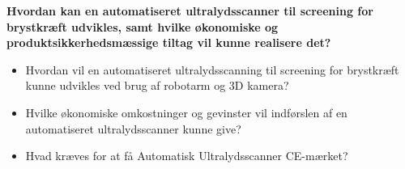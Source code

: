 \textbf{Hvordan kan en automatiseret ultralydsscanner til screening for brystkræft udvikles, samt hvilke økonomiske og produktsikkerhedsmæssige tiltag vil kunne realisere det?}

\let\labelitemi\labelitemii
\begin{itemize}
\item Hvordan vil en automatiseret ultralydsscanning til screening for brystkræft kunne udvikles ved brug af robotarm og 3D kamera?
\item Hvilke økonomiske omkostninger og gevinster vil indførslen af en automatiseret ultralydsscanner kunne give? 
\item Hvad kræves for at få Automatisk Ultralydsscanner CE-mærket? 
\end{itemize}
